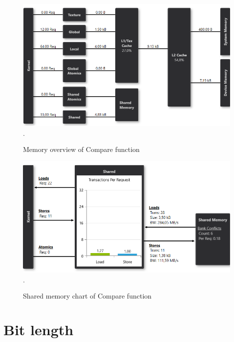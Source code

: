 \documentclass[oneside,openright,12pt,final,en]{mgr}
\begin{document}
\begin{figure}[H]
	\centering
	\includegraphics[width=\textwidth]{compare_memory}.
	\caption{Memory overview of Compare function}
	\label{fig:compare_memory}
\end{figure}

\begin{figure}[H]
	\centering
	\includegraphics[width=\textwidth]{compare_shared}.
	\caption{Shared memory chart of Compare function}
	\label{fig:compare_shared}
\end{figure}


\section{Bit length}
\end{document}
